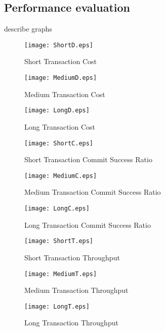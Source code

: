 \documentclass[11pt]{article}
\begin{document}
\subsection{Performance evaluation}
describe graphs
\begin{figure}[htbp]
\begin{center}
\texttt{[image: ShortD.eps]}
\caption{Short Transaction Cost}
\label{ShortD}
\end{center}
\end{figure}
\begin{figure}[htbp]
\begin{center}
\texttt{[image: MediumD.eps]}
\caption{Medium Transaction Cost}
\label{MediumD}
\end{center}
\end{figure}
\begin{figure}[htbp]
\begin{center}
\texttt{[image: LongD.eps]}
\caption{Long Transaction Cost}
\label{LongD}
\end{center}
\end{figure}
\begin{figure}[htbp]
\begin{center}
\texttt{[image: ShortC.eps]}
\caption{Short Transaction Commit Success Ratio}
\label{ShortC}
\end{center}
\end{figure}
\begin{figure}[htbp]
\begin{center}
\texttt{[image: MediumC.eps]}
\caption{Medium Transaction Commit Success Ratio}
\label{MediumC}
\end{center}
\end{figure}
\begin{figure}[htbp]
\begin{center}
\texttt{[image: LongC.eps]}
\caption{Long Transaction Commit Success Ratio}
\label{LongC}
\end{center}
\end{figure}
\begin{figure}[htbp]
\begin{center}
\texttt{[image: ShortT.eps]}
\caption{Short Transaction Throughput}
\label{ShortT}
\end{center}
\end{figure}
\begin{figure}[htbp]
\begin{center}
\texttt{[image: MediumT.eps]}
\caption{Medium Transaction Throughput}
\label{MediumT}
\end{center}
\end{figure}
\begin{figure}[htbp]
\begin{center}
\texttt{[image: LongT.eps]}
\caption{Long Transaction Throughput}
\label{Long T}
\end{center}
\end{figure}
\end{document}
